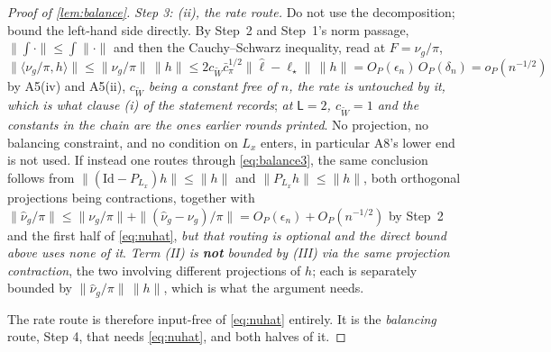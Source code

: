 \begin{proof}[Proof of \cref{lem:balance}]
\emph{Step 3: (ii), the rate route.}
Do not use the decomposition; bound the left-hand side directly. By Step~2 and Step~1's norm passage, 
$\|\int\cdot\|\le\int\|\cdot\|$ and then the Cauchy--Schwarz inequality, read at $F=\nu_g/\pi$, 
$\big\|\langle\nu_g/\pi,h\rangle\big\|\le\|\nu_g/\pi\|\,\|h\|\le2c_{\widetilde W}\bar c_\pi^{1/2}\|\hat\ell-\ell_\star\|\,\|h\|
=O_P(\epsilon_n)\,O_P(\delta_n)=o_P(n^{-1/2})$ by A5(iv) and A5(ii), \emph{$c_{\widetilde W}$ being a
constant free of $n$, the rate is untouched by it, which is what clause \textup{(i)} of the statement
records}; \emph{at $\mathsf L=2$, $c_{\widetilde W}=1$ and the constants in the chain are the ones earlier
rounds printed}. No projection, no balancing
constraint, and no condition on $L_x$ enters, in particular A8's lower end is not used. If instead
one routes through \eqref{eq:balance3}, the same conclusion follows from
$\|(\mathrm{Id}-P_{L_x})h\|\le\|h\|$ and $\|P_{L_x}h\|\le\|h\|$, both orthogonal projections being contractions,
together with $\|\hat\nu_g/\pi\|\le\|\nu_g/\pi\|+\|(\hat\nu_g-\nu_g)/\pi\|=O_P(\epsilon_n)+O_P(n^{-1/2})$
by Step~2 and the first half of \eqref{eq:nuhat}, \emph{but that routing is optional and the direct
bound above uses none of it}. \emph{Term \textup{(II)} is \textbf{not} bounded by \textup{(III)} via the
same projection contraction}, the two involving different projections of $h$; each is separately bounded
by $\|\hat\nu_g/\pi\|\,\|h\|$, which is what the argument needs.

The rate route is therefore input-free of \eqref{eq:nuhat} entirely. It is the \emph{balancing}
route, Step 4, that needs \eqref{eq:nuhat}, and both halves of it.


\end{proof}
